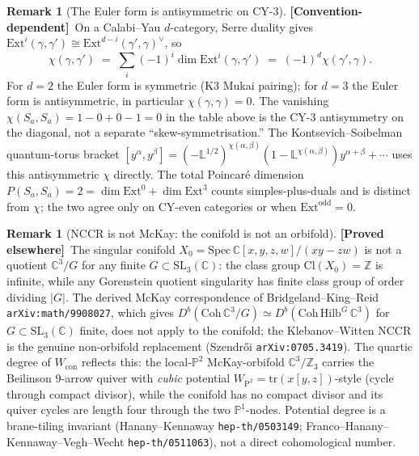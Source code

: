 \documentclass[11pt]{amsart}
\theoremstyle{definition}
\newtheorem{remark}[theorem]{Remark}
\providecommand{\Ext}{\mathrm{Ext}}
\providecommand{\bZ}{\mathbb{Z}}
\providecommand{\bC}{\mathbb{C}}
\providecommand{\bP}{\mathbb{P}}
\providecommand{\bL}{\mathbb{L}}
\providecommand{\ClaimStatusProvedElsewhere}{\textbf{\textsf{[Proved elsewhere]}}}
\providecommand{\ClaimStatusConventionDependent}{\textbf{\textsf{[Convention-dependent]}}}
\begin{document}
\begin{remark}[The Euler form is antisymmetric on CY-$3$]
\label{rem:chi-conventions}
\ClaimStatusConventionDependent\
On a Calabi--Yau $d$-category, Serre duality gives $\Ext^i(\gamma,
\gamma') \cong \Ext^{d-i}(\gamma', \gamma)^\vee$, so
\[
  \chi(\gamma, \gamma') \;=\;
  \sum_i (-1)^i \dim\Ext^i(\gamma, \gamma')
  \;=\; (-1)^d \chi(\gamma', \gamma).
\]
For $d = 2$ the Euler form is symmetric (K3 Mukai pairing); for
$d = 3$ the Euler form is antisymmetric, in particular $\chi(\gamma,
\gamma) = 0$. The vanishing $\chi(S_a, S_a) = 1 - 0 + 0 - 1 = 0$ in
the table above is the CY-$3$ antisymmetry on the diagonal, not a
separate ``skew-symmetrisation.'' The Kontsevich--Soibelman
quantum-torus bracket $[y^\alpha, y^\beta] = (-\bL^{1/2})^{\chi(\alpha,
\beta)}(1 - \bL^{\chi(\alpha, \beta)}) y^{\alpha + \beta} + \cdots$
uses this antisymmetric $\chi$ directly. The total Poincar\'e
dimension $P(S_a, S_a) = 2 = \dim\Ext^0 + \dim\Ext^3$ counts
simples-plus-duals and is distinct from $\chi$; the two agree only on
CY-even categories or when $\Ext^{\mathrm{odd}} = 0$.
\end{remark}

\begin{remark}[NCCR is not McKay: the conifold is not an orbifold]
\label{rem:nccr-not-mckay}
\ClaimStatusProvedElsewhere\
The singular conifold $X_0 = \mathrm{Spec}\,\bC[x,y,z,w]/(xy - zw)$ is
not a quotient $\bC^3 / G$ for any finite $G \subset \mathrm{SL}_3(\bC)$:
the class group $\mathrm{Cl}(X_0) = \bZ$ is infinite, while any
Gorenstein quotient singularity has finite class group of order
dividing $|G|$. The derived McKay correspondence of Bridgeland--King--Reid
\texttt{arXiv:math/9908027}, which gives $D^b(\mathrm{Coh}\,\bC^3/G)
\simeq D^b(\mathrm{Coh}\,\mathrm{Hilb}^G\,\bC^3)$ for $G \subset
\mathrm{SL}_3(\bC)$ finite, does not apply to the conifold; the
Klebanov--Witten NCCR is the genuine non-orbifold replacement
(Szendr\H{o}i \texttt{arXiv:0705.3419}). The quartic degree of
$W_{\mathrm{con}}$ reflects this: the local-$\bP^2$ McKay-orbifold
$\bC^3/\bZ_3$ carries the Beilinson 9-arrow quiver with \emph{cubic}
potential $W_{\mathrm{P}^2} = \mathrm{tr}(x[y, z])$-style (cycle through
compact divisor), while the conifold has no compact divisor and its
quiver cycles are length four through the two $\bP^1$-nodes. Potential
degree is a brane-tiling invariant (Hanany--Kennaway
\texttt{hep-th/0503149}; Franco--Hanany--Kennaway--Vegh--Wecht
\texttt{hep-th/0511063}), not a direct cohomological number.
\end{remark}
\end{document}
